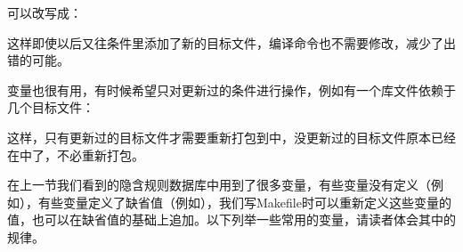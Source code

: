 可以改写成：




这样即使以后又往条件里添加了新的目标文件，编译命令也不需要修改，减少了出错的可能。



变量也很有用，有时候希望只对更新过的条件进行操作，例如有一个库文件依赖于几个目标文件：




这样，只有更新过的目标文件才需要重新打包到中，没更新过的目标文件原本已经在中了，不必重新打包。



在上一节我们看到的隐含规则数据库中用到了很多变量，有些变量没有定义（例如），有些变量定义了缺省值（例如），我们写Makefile时可以重新定义这些变量的值，也可以在缺省值的基础上追加。以下列举一些常用的变量，请读者体会其中的规律。


